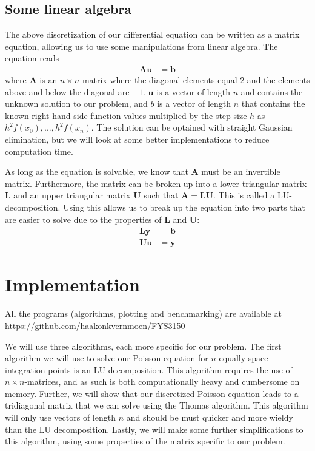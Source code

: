 \documentclass[english]{article}
\renewcommand{\vec}{\mathbf} %
\begin{document}
\subsection{Some linear algebra}
The above discretization of our differential equation can be written as a matrix equation, allowing us to use some manipulations from linear algebra. The equation reads
\begin{align*}
    \vec{Au} &= \vec{b}
\end{align*}
where $\vec{A}$ is an $n\times n$ matrix where the diagonal elements equal $2$ and the elements above and below the diagonal are $-1$. $\vec{u}$ is a vector of length $n$ and contains the unknown solution to our problem, and $b$ is a vector of length $n$ that contains the known right hand side function values multiplied by the step size $h$ as $h^2f(x_0), ..., h^2f(x_n)$. The solution can be optained with straight Gaussian elimination, but we will look at some better implementations to reduce computation time. 

As long as the equation is solvable, we know that $\vec{A}$ must be an invertible matrix. Furthermore, the matrix can be broken up into a lower triangular matrix $\vec{L}$ and an upper triangular matrix $\vec{U}$ such that $\vec{A} = \vec{LU}$. This is called a LU-decomposition. Using this allows us to break up the equation into two parts that are easier to solve due to the properties of $\vec{L}$ and $\vec{U}$:
\begin{align*}
    \vec{Ly} &= \vec{b} \\
    \vec{Uu} &= \vec{y}
\end{align*}




\section{Implementation}
All the programs (algorithms, plotting and benchmarking) are available at \url{https://github.com/haakonkvernmoen/FYS3150}

We will use three algorithms, each more specific for our problem. The first algorithm we will use to solve our Poisson equation for $n$ equally space integration points is an LU decomposition. This algorithm requires the use of $n\times n$-matrices, and as such is both computationally heavy and cumbersome on memory. Further, we will show that our discretized Poisson equation leads to a tridiagonal matrix that we can solve using the Thomas algorithm. This algorithm will only use vectors of length $n$ and should be must quicker and more wieldy than the LU decomposition. Lastly, we will make some further simplifications to this algorithm, using some properties of the matrix specific to our problem.
\end{document}
